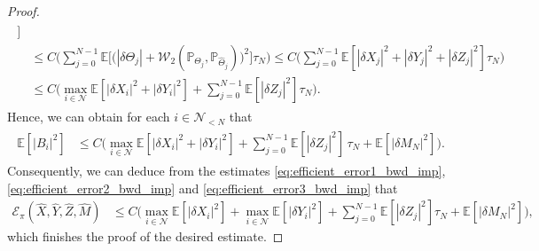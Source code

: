\documentclass[11pt]{article}
\numberwithin{equation}{section}
\theoremstyle{definition}
\theoremstyle{remark}
\def\l{\label}  \def\f{\frac}  \def\fa{\forall}
\def\cE{\mathcal{E}}
\def\cN{\mathcal{N}}
\def\cW{\mathcal{W}}
\def\sE{{\mathbb{E}}}
\def\sP{\mathbb{P}}
\begin{document}
\begin{proof}
\begin{align*}
\begin{split}
\bigg]   
\\ 
&\le 
C\bigg( 
\sum_{j=0}^{N-1}
\sE\bigg[\big(
|\delta \Theta_{j}|
+\cW_2(\sP_{\Theta_{j}},\sP_{\hat{\Theta}_{j}})
\big)^2
\bigg]
\tau_N\bigg) 
\le 
C\bigg( 
\sum_{j=0}^{N-1}
\sE[
|\delta X_{j}|^2+|\delta Y_{j}|^2+
|\delta Z_{j}|^2]
\tau_N
\bigg)   
\\
&\le 
C
\bigg( 
\max_{i\in\cN}
\sE[
|\delta X_i|^2+|\delta Y_i|^2]
 +
\sum_{j=0}^{N-1}
\sE[
|\delta Z_{j}|^2]
\tau_N\bigg).  
\end{split}
\end{align*}
Hence, we can obtain for each $i\in \cN_{<N}$
 that 
\begin{align}\l{eq:efficient_error3_bwd_imp}
\begin{split}
\sE[|B_i|^2]
&\le C\bigg(
\max_{i\in \cN}\sE[|\delta X_{i}|^2+|\delta Y_{i}|^2]
 +
\sum_{j=0}^{N-1}
\sE[ |\delta{Z}_j|^2]\,\tau_N
 +\sE[| \delta {M}_N|^2]
\bigg).
\end{split}
\end{align}
Consequently, 
we can  deduce from 
the estimates 
\eqref{eq:efficient_error1_bwd_imp}, \eqref{eq:efficient_error2_bwd_imp} and \eqref{eq:efficient_error3_bwd_imp}
that
\begin{align*}
\cE_\pi(\hat{X},\hat{Y},\hat{Z}, \hat{M})
&\le
C
\bigg(\max_{i\in \cN}\sE[|\delta {X}_i|^2]
+
\max_{i\in\cN}\sE[ |\delta Y_i|^2]
+
\sum_{j=0}^{N-1}\sE[ |\delta Z_j|^2]\tau_N
 +
\sE[| \delta {M}_N|^2]
\bigg),
\end{align*}
which finishes the proof of the desired estimate.
%
%
%
\end{proof}
\end{document}
